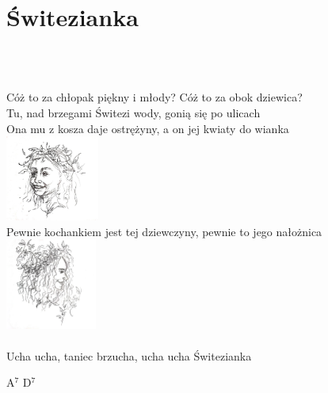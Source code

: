 \documentclass[a5paper, 10pt]{book}
\begin{document}
\section{Świtezianka}\textcolor{lightgray}{\textit{}}\\~\\
\begin{minipage}[t]{0.8\textwidth}
  Cóż to za chłopak piękny i młody? Cóż to za obok dziewica?\\
  Tu, nad brzegami Świtezi wody, gonią się po ulicach\\
  Ona mu z kosza daje ostrężyny, a on jej kwiaty do wianka\\
  \vspace*{10mm}\hspace*{10cm}\includegraphics[height=2.8cm]{switezianka.png}\vspace*{-3.2cm}\\
  Pewnie kochankiem jest tej dziewczyny, pewnie to jego nałożnica\\
  \hspace*{8.5cm}\includegraphics[height=3cm]{switezianka2.png}\vspace*{-3.1cm}\\
  \\
  \hspace*{5mm}Ucha ucha, taniec brzucha, ucha ucha Świtezianka\\
\end{minipage}
\begin{minipage}[t]{0.2\textwidth}
  A$^7$ D$^7$\\

\end{minipage}

\newpage
\end{document}
